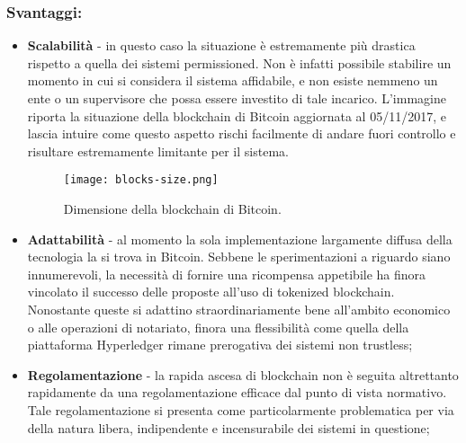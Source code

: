 		\subsubsection{Svantaggi:}
			\begin{itemize}
				\item \textbf{Scalabilità} - in questo caso la situazione è estremamente più drastica rispetto a quella dei sistemi permissioned. Non è infatti possibile stabilire un momento in cui si considera il sistema affidabile, e non esiste nemmeno un ente o un supervisore che possa essere investito di tale incarico. L'immagine riporta la situazione della blockchain di Bitcoin aggiornata al 05/11/2017, e lascia intuire come questo aspetto rischi facilmente di andare fuori controllo e risultare estremamente limitante per il sistema.
				\begin{figure}[ht]
					\centering
					\texttt{[image: blocks-size.png]}
					\caption[Dimensione della blockchain di Bitcoin]{Dimensione della blockchain di Bitcoin.}
					\label{fig:blocks.size}
				\end{figure}
				\item \textbf{Adattabilità} - al momento la sola implementazione largamente diffusa della tecnologia la si trova in Bitcoin. Sebbene le sperimentazioni a riguardo siano innumerevoli, la necessità di fornire una ricompensa appetibile ha finora vincolato il successo delle proposte all'uso di tokenized blockchain. Nonostante queste si adattino straordinariamente bene all'ambito economico o alle operazioni di notariato, finora una flessibilità come quella della piattaforma Hyperledger rimane prerogativa dei sistemi non trustless;
				\item \textbf{Regolamentazione} - la rapida ascesa di blockchain non è seguita altrettanto rapidamente da una regolamentazione efficace dal punto di vista normativo. Tale regolamentazione si presenta come particolarmente problematica per via della natura libera, indipendente e incensurabile dei sistemi in questione;

\end{itemize}

